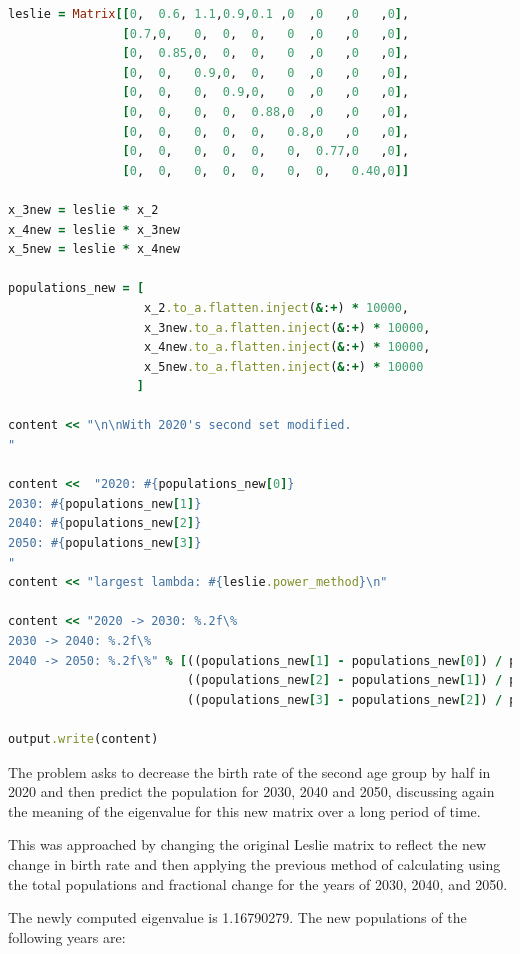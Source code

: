\documentclass[letterpaper,12pt]{article}
\begin{document}
\lstset{caption=Populations}
\begin{lstlisting}[language=ruby]
leslie = Matrix[[0,  0.6, 1.1,0.9,0.1 ,0  ,0   ,0   ,0],
                [0.7,0,   0,  0,  0,   0  ,0   ,0   ,0],
                [0,  0.85,0,  0,  0,   0  ,0   ,0   ,0],
                [0,  0,   0.9,0,  0,   0  ,0   ,0   ,0],
                [0,  0,   0,  0.9,0,   0  ,0   ,0   ,0],
                [0,  0,   0,  0,  0.88,0  ,0   ,0   ,0],
                [0,  0,   0,  0,  0,   0.8,0   ,0   ,0],
                [0,  0,   0,  0,  0,   0,  0.77,0   ,0],
                [0,  0,   0,  0,  0,   0,  0,   0.40,0]]

x_3new = leslie * x_2
x_4new = leslie * x_3new
x_5new = leslie * x_4new

populations_new = [
                   x_2.to_a.flatten.inject(&:+) * 10000,
                   x_3new.to_a.flatten.inject(&:+) * 10000,
                   x_4new.to_a.flatten.inject(&:+) * 10000,
                   x_5new.to_a.flatten.inject(&:+) * 10000
                  ]

content << "\n\nWith 2020's second set modified.
"

content <<  "2020: #{populations_new[0]}
2030: #{populations_new[1]}
2040: #{populations_new[2]}
2050: #{populations_new[3]}
"
content << "largest lambda: #{leslie.power_method}\n"

content << "2020 -> 2030: %.2f\%
2030 -> 2040: %.2f\%
2040 -> 2050: %.2f\%" % [((populations_new[1] - populations_new[0]) / populations_new[0] * 100),
                         ((populations_new[2] - populations_new[1]) / populations_new[1] * 100),
                         ((populations_new[3] - populations_new[2]) / populations_new[2] * 100)]

output.write(content)
\end{lstlisting}

The problem asks to decrease the birth rate of the second age group by half in 2020
and then predict the population for 2030, 2040 and 2050, discussing again the meaning
of the eigenvalue for this new matrix over a long period of time.

This was approached by changing the original Leslie matrix to reflect the new change
in birth rate and then applying the previous method of calculating using the total populations
and fractional change for the years of 2030, 2040, and 2050. 

The newly computed eigenvalue is 1.16790279. The new populations of the following years are:
\end{document}
